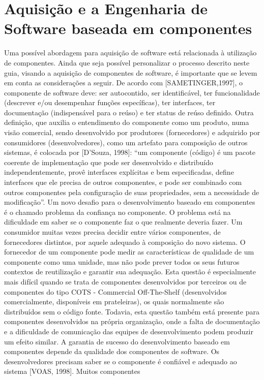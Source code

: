 \chapter{Aquisição e a Engenharia de Software baseada em componentes}
Uma possível abordagem para aquisição de software está relacionada à utilização
de componentes. Ainda que seja possível personalizar o processo descrito neste
guia, visando a aquisição de componentes de software, é importante que se levem
em conta as considerações a seguir.
De acordo com [SAMETINGER,1997], o componente de software deve: ser
autocontido, ser identificável, ter funcionalidade (descrever e/ou desempenhar
funções específicas), ter interfaces, ter documentação (indispensável para o reúso) e
ter status de reúso definido.
Outra definição, que auxilia o entendimento do componente como um produto, numa
visão comercial, sendo desenvolvido por produtores (fornecedores) e adquirido por
consumidores (desenvolvedores), como um artefato para composição de outros
sistemas, é colocada por [D’Souza, 1998]: “um componente (código) é um pacote
coerente de implementação que pode ser desenvolvido e distribuído
independentemente, provê interfaces explícitas e bem especificadas, define
interfaces que ele precisa de outros componentes, e pode ser combinado com
outros componentes pela configuração de suas propriedades, sem a necessidade de
modificação”.
Um novo desafio para o desenvolvimento baseado em componentes é o chamado
problema da confiança no componente. O problema está na dificuldade em saber se
o componente faz o que realmente deveria fazer. Um consumidor muitas vezes
precisa decidir entre vários componentes, de fornecedores distintos, por aquele
adequado à composição do novo sistema.
O fornecedor de um componente pode medir as características de qualidade de um
componente como uma unidade, mas não pode prever todos os seus futuros
contextos de reutilização e garantir sua adequação. Esta questão é especialmente
mais difícil quando se trata de componentes desenvolvidos por terceiros ou de
componentes do tipo COTS - Commercial Off-The-Shelf (desenvolvidos
comercialmente, disponíveis em prateleiras), os quais normalmente são distribuídos
sem o código fonte. Todavia, esta questão também está presente para componentes
desenvolvidos na própria organização, onde a falta de documentação e a dificuldade
de comunicação das equipes de desenvolvimento podem produzir um efeito similar.
A garantia de sucesso do desenvolvimento baseado em componentes depende da
qualidade dos componentes de software. Os desenvolvedores precisam saber se o
componente é confiável e adequado ao sistema [VOAS, 1998]. Muitos componentes
